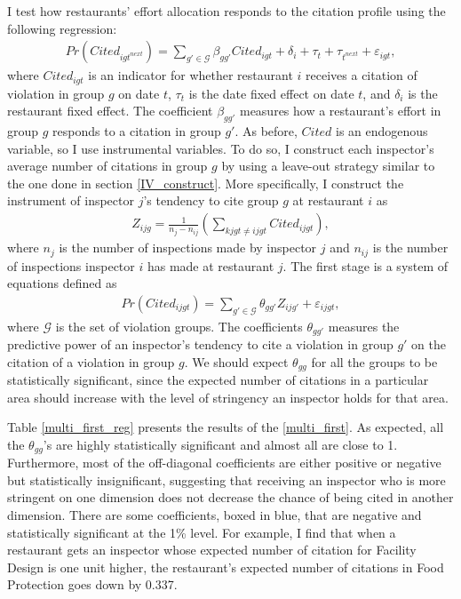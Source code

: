 \documentclass[12pt]{article}
\begin{document}
I test how restaurants' effort allocation responds to the citation profile using the following regression: 
\begin{align}
\label{multi_second}
    Pr(Cited_{igt^{next}}) = \sum_{g' \in \mathcal{G}} \beta_{gg'} Cited_{igt} + \delta_i + \tau_t + \tau_{t^{next}} + \varepsilon_{igt},
\end{align}
where $Cited_{igt}$ is an indicator for whether restaurant $i$ receives a citation of violation in group $g$ on date $t$, $\tau_t$ is the date fixed effect on date $t$, and $\delta_i$ is the restaurant fixed effect. The coefficient $\beta_{gg'}$ measures how a restaurant's effort in group $g$ responds to a citation in group $g'$. As before, $Cited$ is an endogenous variable, so I use instrumental variables. To do so, I construct each inspector's average number of citations in group $g$ by using a leave-out strategy similar to the one done in section \ref{IV_construct}. More specifically, I construct the instrument of inspector $j$'s tendency to cite group $g$ at restaurant $i$ as
\begin{align*}
  Z_{ijg} = \frac{1}{n_j - n_{ij}} \left(\sum_{kjgt \neq ijgt} Cited_{ijgt}\right),
\end{align*}
where $n_j$ is the number of inspections made by inspector $j$ and $n_{ij}$ is the number of inspections inspector $i$ has made at restaurant $j$. The first stage is a system of equations defined as
\begin{align}
\label{multi_first}
    Pr(Cited_{ijgt}) = \sum_{g'\in \mathcal{G}} \theta_{gg'}Z_{ijg'} + \varepsilon_{ijgt}, 
\end{align}
where $\mathcal{G}$ is the set of violation groups. The coefficients $\theta_{gg'}$ measures the predictive power of an inspector's tendency to cite a violation in group $g'$ on the citation of a violation in group $g$. We should expect $\theta_{gg}$ for all the groups to be statistically significant, since the expected number of citations in a particular area should increase with the level of stringency an inspector holds for that area.

Table \ref{multi_first_reg} presents the results of the \eqref{multi_first}. As expected, all the $\theta_{gg}$'s are highly statistically significant and almost all are close to 1. Furthermore, most of the off-diagonal coefficients are either positive or negative but statistically insignificant, suggesting that receiving an inspector who is more stringent on one dimension does not decrease the chance of being cited in another dimension. There are some coefficients, boxed in blue, that are negative and statistically significant at the 1\% level. For example, I find that when a restaurant gets an inspector whose expected number of citation for Facility Design is one unit higher, the restaurant's expected number of citations in Food Protection goes down by 0.337. 
\end{document}
